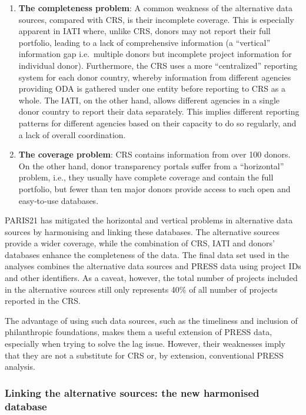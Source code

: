 \documentclass[
]{article}
\begin{document}
\begin{enumerate}
\def\labelenumi{\arabic{enumi}.}
\item
  \textbf{The completeness problem}: A common weakness of the alternative data sources,
  compared with CRS, is their incomplete coverage. This is especially apparent in IATI where,
  unlike CRS, donors may not report their full portfolio, leading to a lack of comprehensive
  information (a ``vertical'' information gap i.e.~multiple donors but incomplete project
  information for individual donor). Furthermore, the CRS uses a more ``centralized'' reporting
  system for each donor country, whereby information from different agencies providing ODA
  is gathered under one entity before reporting to CRS as a whole. The IATI, on the other hand,
  allows different agencies in a single donor country to report their data separately. This implies
  different reporting patterns for different agencies based on their capacity to do so regularly,
  and a lack of overall coordination.
\item
  \textbf{The coverage problem}: CRS contains information from over 100 donors. On the other
  hand, donor transparency portals suffer from a ``horizontal'' problem, i.e., they usually have
  complete coverage and contain the full portfolio, but fewer than ten major donors provide
  access to such open and easy‐to‐use databases.
\end{enumerate}

PARIS21 has mitigated the horizontal and vertical problems in alternative data sources by harmonising
and linking these databases. The alternative sources provide a wider coverage, while the combination
of CRS, IATI and donors' databases enhance the completeness of the data. The final data set used in
the analyses combines the alternative data sources and PRESS data using project IDs and other
identifiers. As a caveat, however, the total number of projects included in the alternative sources still
only represents 40\% of all number of projects reported in the CRS.

The advantage of using such data sources, such as the timeliness and inclusion of philanthropic
foundations, makes them a useful extension of PRESS data, especially when trying to solve the lag
issue. However, their weaknesses imply that they are not a substitute for CRS or, by extension,
conventional PRESS analysis.

\hypertarget{linking-the-alternative-sources-the-new-harmonised-database}{%
\subsubsection{Linking the alternative sources: the new harmonised database}\label{linking-the-alternative-sources-the-new-harmonised-database}}
\end{document}
